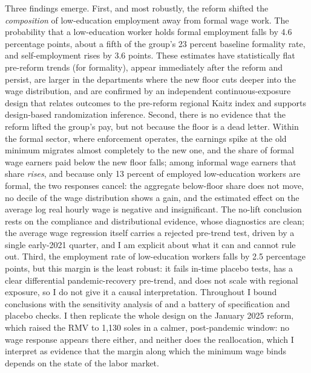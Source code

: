 Three findings emerge. First, and most robustly, the reform shifted the \emph{composition}
of low-education employment away from formal wage work. The probability that a low-education
worker holds formal employment falls by 4.6 percentage points, about a fifth of the group's
23 percent baseline formality rate, and self-employment rises by 3.6 points. These estimates
have statistically flat pre-reform trends (for formality), appear immediately after the
reform and persist, are larger in the departments where the new floor cuts deeper into the
wage distribution, and are confirmed by an independent continuous-exposure design that
relates outcomes to the pre-reform regional Kaitz index and supports design-based
randomization inference. Second, there is no evidence that the reform lifted the group's pay, but not because
the floor is a dead letter. Within the formal sector, where enforcement operates, the
earnings spike at the old minimum migrates almost completely to the new one, and the
share of formal wage earners paid below the new floor falls; among informal wage
earners that share \emph{rises}, and because only 13 percent of employed low-education
workers are formal, the two responses cancel: the aggregate below-floor share does not
move, no decile of the wage distribution shows a gain, and the estimated effect on the
average log real hourly wage is negative and insignificant. The no-lift conclusion
rests on the compliance and distributional evidence, whose diagnostics are clean; the
average wage regression itself carries a rejected pre-trend test, driven by a single
early-2021 quarter, and I am explicit about what it can and cannot rule out. Third, the employment
rate of low-education workers falls by 2.5 percentage points, but this margin is the least
robust: it fails in-time placebo tests, has a clear differential pandemic-recovery
pre-trend, and does not scale with regional exposure, so I do not give it a causal
interpretation. Throughout I bound conclusions with the sensitivity analysis of
\citet{rambachan_roth_2023} and a battery of specification and placebo checks. I then
replicate the whole design on the January 2025 reform, which raised the RMV to 1,130 soles
in a calmer, post-pandemic window: no wage response appears there either, and neither does
the reallocation, which I interpret as evidence that the margin along which the minimum
wage binds depends on the state of the labor market.

